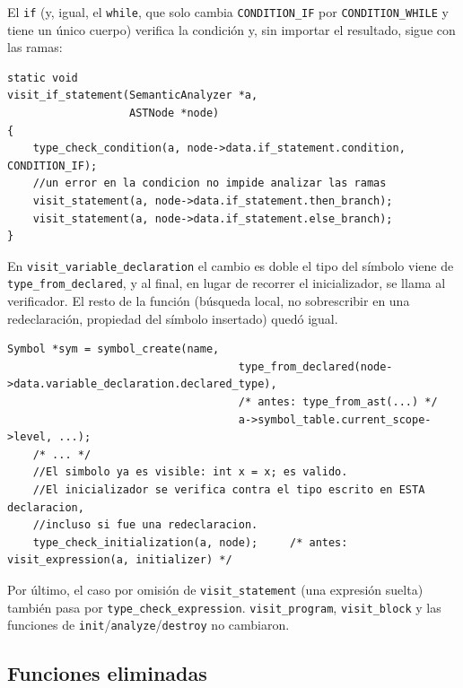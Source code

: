 \documentclass[12pt,letterpaper]{article}
\begin{document}
\bigskip

El \texttt{if} (y, igual, el \texttt{while}, que solo cambia \texttt{CONDITION\_IF} por
\texttt{CONDITION\_WHILE} y tiene un único cuerpo) verifica la condición y, sin importar el resultado, sigue con
las ramas:

\begin{lstlisting}[style=modernc, caption={\texttt{semantic.c}: \texttt{visit\_if\_statement}.}]
static void
visit_if_statement(SemanticAnalyzer *a,
                   ASTNode *node)
{
    type_check_condition(a, node->data.if_statement.condition, CONDITION_IF);
    //un error en la condicion no impide analizar las ramas
    visit_statement(a, node->data.if_statement.then_branch);
    visit_statement(a, node->data.if_statement.else_branch);
}
\end{lstlisting}

\bigskip

En \texttt{visit\_variable\_declaration} el cambio es doble el tipo del símbolo viene de
\texttt{type\_from\_declared}, y al final, en lugar de recorrer el inicializador, se llama al verificador.
El resto de la función (búsqueda local, no sobrescribir en una redeclaración, propiedad del símbolo
insertado) quedó igual.

\begin{lstlisting}[style=modernc, caption={\texttt{semantic.c}: cambios en \texttt{visit\_variable\_declaration}.}]
        Symbol *sym = symbol_create(name,
                                    type_from_declared(node->data.variable_declaration.declared_type),
                                    /* antes: type_from_ast(...) */
                                    a->symbol_table.current_scope->level, ...);
    /* ... */
    //El simbolo ya es visible: int x = x; es valido.
    //El inicializador se verifica contra el tipo escrito en ESTA declaracion,
    //incluso si fue una redeclaracion.
    type_check_initialization(a, node);     /* antes: visit_expression(a, initializer) */
\end{lstlisting}

\bigskip

Por último, el caso por omisión de \texttt{visit\_statement} (una expresión suelta) también pasa por
\texttt{type\_check\_expression}. \texttt{visit\_program}, \texttt{visit\_block} y las funciones de
\texttt{init}/\texttt{analyze}/\texttt{destroy} no cambiaron.

\subsection*{Funciones eliminadas}
\end{document}
